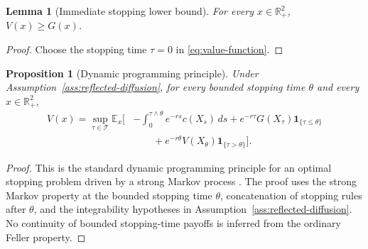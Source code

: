 \documentclass[pdflatex,sn-mathphys-num]{sn-jnl}
\theoremstyle{plain}
\newtheorem{proposition}[theorem]{Proposition}
\newtheorem{lemma}[theorem]{Lemma}
\theoremstyle{definition}
\newcommand{\R}{\mathbb{R}}
\begin{document}
\begin{lemma}[Immediate stopping lower bound]
\label{lem:immediate-stopping}
For every $x\in\R^2_+$, $V(x)\ge G(x)$.
\end{lemma}
\begin{proof}
Choose the stopping time $\tau=0$ in \eqref{eq:value-function}.
\end{proof}

\begin{proposition}[Dynamic programming principle]
\label{prop:dpp}
Under Assumption~\ref{ass:reflected-diffusion}, for every bounded stopping
time $\theta$ and every $x\in\R^2_+$,
\begin{equation*}
\begin{aligned}
   V(x)
   =
   \sup_{\tau\in\mathcal T}
   \mathbb E_x\Bigg[
   &-\int_0^{\tau\wedge\theta}e^{-rs}c(X_s)\,ds
   +e^{-r\tau}G(X_\tau)\mathbf 1_{\{\tau\le\theta\}}
   \nonumber\\
   &\qquad
   +e^{-r\theta}V(X_\theta)\mathbf 1_{\{\tau>\theta\}}
   \Bigg].
   \end{aligned}
\end{equation*}
\end{proposition}
\begin{proof}
This is the standard dynamic programming principle for an optimal stopping
problem driven by a strong Markov process \cite{el2006aspects,peskir2006optimal,wang2025multi}.
The proof uses the strong Markov property at the bounded stopping time
$\theta$, concatenation of stopping rules after $\theta$, and the
integrability hypotheses in Assumption~\ref{ass:reflected-diffusion}. No
continuity of bounded stopping-time payoffs is inferred from the ordinary
Feller property.
\end{proof}
\end{document}
